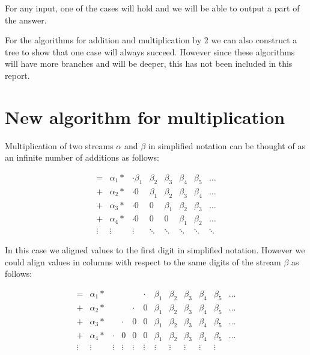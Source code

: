 \documentclass{cs4rep}
\begin{document}
For any input, one of the cases will hold and we will be able to
output a part of the answer.

For the algorithms for addition and multiplication by 2 we can also
construct a tree to show that one case will always succeed. However
since these algorithms will have more branches and will be deeper, this has not been included in this report.

\section{New algorithm for multiplication}

Multiplication of two streams $\alpha$ and $\beta$ in simplified
notation can be thought of as an infinite number of additions as
follows:

\[ \begin{array}{cccccccc}
= & \alpha_{1} * & \cdot \beta_{1} & \beta_{2} & \beta_{3} & \beta_{4} & \beta_{5} & \ldots \\
+ & \alpha_{2} * & \cdot 0 & \beta_{1} & \beta_{2} & \beta_{3} & \beta_{4} & \ldots \\
+ & \alpha_{3} * & \cdot 0 & 0 & \beta_{1} & \beta_{2} & \beta_{3} & \ldots \\
+ & \alpha_{4} * & \cdot 0 & 0 & 0 & \beta_{1} & \beta_{2} & \ldots \\
\vdots & \vdots & \vdots & \ddots & \ddots & \ddots & \ddots & \ddots 
\end{array} \]

In this case we aligned values to the first digit in simplified notation. However we could
align values in columns with respect to the same digits of the stream
$\beta$ as follows:

\[ \begin{array}{cccccc|cccccc}
= & \alpha_{1} * &&&& \cdot & \beta_{1} & \beta_{2} & \beta_{3} & \beta_{4} & \beta_{5} & \ldots \\
+ & \alpha_{2} * &&& \cdot & 0 & \beta_{1} & \beta_{2} & \beta_{3} & \beta_{4} & \beta_{5} & \ldots \\
+ & \alpha_{3} * && \cdot & 0 & 0 & \beta_{1} & \beta_{2} & \beta_{3} & \beta_{4} & \beta_{5} & \ldots \\
+ & \alpha_{4} * & \cdot & 0 & 0 & 0 &\beta_{1} & \beta_{2} & \beta_{3} & \beta_{4} & \beta_{5} & \ldots \\
\vdots & \vdots & \vdots & \vdots & \vdots & \vdots & \vdots & \vdots & \vdots & \vdots & \vdots
\end{array} \]
\end{document}
